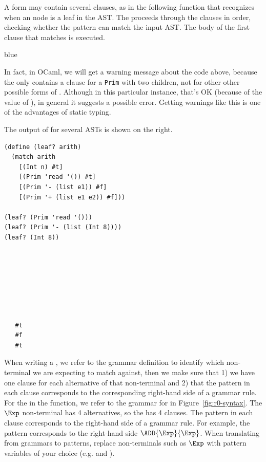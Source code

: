 \documentclass[11pt]{book}
\newenvironment{ocamlx}{
  \begin{color}{blue}
}
{
  \end{color}
}
\begin{document}
A  form may contain several clauses, as in the following
function  that recognizes when an \LangInt{} node is a leaf in
the AST. The  proceeds through the clauses in order,
checking whether the pattern can match the input AST. The body of the
first clause that matches is executed.
\begin{ocamlx}
In fact, in OCaml, we will get a warning message about the code above, because the  only contains
a clause for a {\tt Prim} with two children, not for other other possible forms of .
Although in this particular instance, that's OK (because of the value of ), in general
it suggests a possible error. Getting warnings like this is one of the advantages of static typing.
\end{ocamlx}
The output of  for
several ASTs is shown on the right.
\begin{center}
\begin{minipage}{0.6\textwidth}
\begin{lstlisting}
(define (leaf? arith)
  (match arith
    [(Int n) #t]
    [(Prim 'read '()) #t]
    [(Prim '- (list e1)) #f]
    [(Prim '+ (list e1 e2)) #f]))

(leaf? (Prim 'read '()))
(leaf? (Prim '- (list (Int 8))))
(leaf? (Int 8))
\end{lstlisting}
\end{minipage}
\vrule
\begin{minipage}{0.25\textwidth}
  \begin{lstlisting}






    
   #t
   #f
   #t
\end{lstlisting}
\end{minipage}
\end{center}

When writing a , we refer to the grammar definition to
identify which non-terminal we are expecting to match against, then we
make sure that 1) we have one clause for each alternative of that
non-terminal and 2) that the pattern in each clause corresponds to the
corresponding right-hand side of a grammar rule. For the 
in the  function, we refer to the grammar for \LangInt{} in
Figure~\ref{fig:r0-syntax}. The $\Exp$ non-terminal has 4
alternatives, so the  has 4 clauses.  The pattern in each
clause corresponds to the right-hand side of a grammar rule. For
example, the pattern  corresponds to the
right-hand side $\ADD{\Exp}{\Exp}$. When translating from grammars to
patterns, replace non-terminals such as $\Exp$ with pattern variables
of your choice (e.g.  and ).
\end{document}
